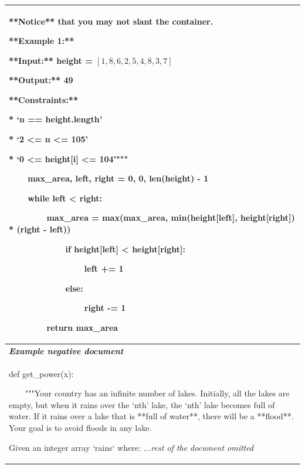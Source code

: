 \begin{table}[ht]
\begin{tabular}{p{13cm}}
    **Notice** that you may not slant the container.
    
    **Example 1:**
    
    **Input:** height = $[1,8,6,2,5,4,8,3,7]$
    
    **Output:** 49
    
    
    
    
    
    **Constraints:**
    
    *   `n == height.length'
    
    *   `2 <= n <= 105'
    
    *   `0 <= height[i] <= 104'"""

~~~~max\_area, left, right = 0, 0, len(height) - 1

~~~~while left < right:

~~~~~~~~max\_area = max(max\_area, min(height[left], height[right]) * (right - left))

~~~~~~~~~~~~if height[left] < height[right]:

~~~~~~~~~~~~~~~~left += 1

~~~~~~~~~~~~else:

~~~~~~~~~~~~~~~~right -= 1

~~~~~~~~return max\_area\\
\midrule
\textit{\textbf{Example negative document}} \\
\midrule
def get\_power(x):

~~~~"""Your country has an infinite number of lakes. Initially, all the lakes are empty, but when it rains over the `nth' lake, the `nth' lake becomes full of water. If it rains over a lake that is **full of water**, there will be a **flood**. Your goal is to avoid floods in any lake.

Given an integer array `rains` where: \textit{...rest of the document omitted}\\
\bottomrule
\end{tabular}
\label{tab:example_leetcode}
\end{table}